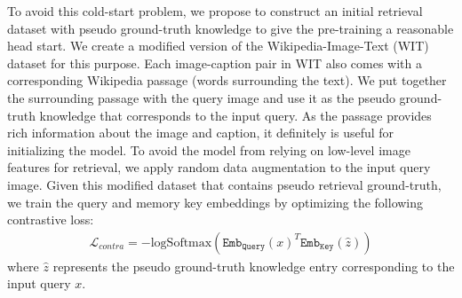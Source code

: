 \documentclass[10pt,twocolumn,letterpaper]{article}
\begin{document}
To avoid this cold-start problem, we propose to construct an initial retrieval dataset with pseudo ground-truth knowledge to give the pre-training a reasonable head start. We create a modified version of the Wikipedia-Image-Text (WIT)~\cite{DBLP:conf/sigir/Srinivasan0CBN21} dataset for this purpose. Each image-caption pair in WIT also comes with a corresponding Wikipedia passage (words surrounding the text). We put together the surrounding passage with the query image and use it as the pseudo ground-truth knowledge that corresponds to the input query. As the passage provides rich information about the image and caption, it definitely is useful for initializing the model. To avoid the model from relying on low-level image features for retrieval, we apply random data augmentation to the input query image.  Given this modified dataset that contains pseudo retrieval ground-truth, we train the query and memory key embeddings by optimizing the following contrastive loss: 
\begin{align*}
\mathcal{L}_{contra} = - \text{logSoftmax}(\texttt{Emb}_{\texttt{Query}}(x)^T \texttt{Emb}_{\texttt{Key}}(\hat{z}))
\end{align*}
where $\hat{z}$ represents the pseudo ground-truth knowledge entry corresponding to the input query $x$.
\end{document}
